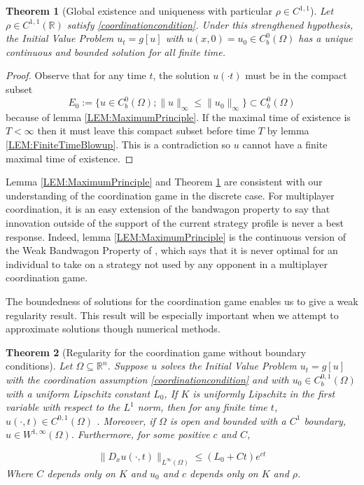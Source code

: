 \documentclass[aps,
preprint,
groupedaddress,
showkeys,
amsmath]{revtex4-2}
\newtheorem{theorem}{Theorem}
\begin{document}
    \begin{theorem}[Global existence and uniqueness with particular $\rho\in C^{1,1}$]\label{THM:GlobalExistenceAndUniqueness}
    Let $\rho\in C^{1,1}(\mathbb{R})$ satisfy \eqref{coordinationcondition}. Under this strengthened hypothesis, the Initial Value Problem $u_t=g[u]$ with $u(x,0)=u_0\in C_b^0(\Omega)$ has a unique continuous and bounded solution for all finite time.
    \end{theorem}

    \begin{proof}
        Observe that for any time $t$, the solution $u(\cdot t)$ must be in the compact subset 
        \[E_0:=\{u\in C_b^0(\Omega);\|u\|_\infty\leq \|u_0\|_\infty\}\subset C^0_b(\Omega)\]
        because of lemma \ref{LEM:MaximumPrinciple}. If the maximal time of existence is $T<\infty$ then it must leave this compact subset before time $T$ by lemma \ref{LEM:FiniteTimeBlowup}. This is a contradiction so $u$ cannot have a finite maximal time of existence. 
    \end{proof}

    Lemma \ref{LEM:MaximumPrinciple} and Theorem \ref{THM:GlobalExistenceAndUniqueness} are consistent with our understanding of the coordination game in the discrete case. For multiplayer coordination, it is an easy extension of the bandwagon property to say that innovation outside of the support of the current strategy profile is never a best response. Indeed, lemma \ref{LEM:MaximumPrinciple} is the continuous version of the Weak Bandwagon Property of \cite{cui2022}, which says that it is never optimal for an individual to take on a strategy not used by any opponent in a multiplayer coordination game. 

    The boundedness of solutions for the coordination game enables us to give a weak regularity result.  This result will be especially important when we attempt to approximate solutions though numerical methods. 


    \begin{theorem}[Regularity for the coordination game without boundary conditions]\label{THM:Regularity}
        Let $\Omega\subseteq \mathbb{R}^n$. Suppose $u$ solves the Initial Value Problem $u_t=g[u]$ with the coordination assumption \eqref{coordinationcondition} and with $u_0\in C^{0,1}_b(\Omega)$ with a uniform Lipschitz constant $L_0$, If $K$ is uniformly Lipschitz in the first variable with respect to the $L^1$ norm, then for any finite time $t$, $u(\cdot, t)\in C^{0,1}(\Omega)$ . Moreover, if $\Omega$ is open and bounded with a $C^1$ boundary,  $u\in W^{1,\infty}(\Omega)$. Furthermore, for some positive $c$ and $C$, 
        
       \[\|D_xu(\cdot, t)\|_{L^\infty(\Omega)}\leq (L_0+Ct)e^{ct} \]
        Where $C$ depends only on $K$ and $u_0$ and $c$ depends only on $K$ and $\rho$.
    \end{theorem}
\end{document}
